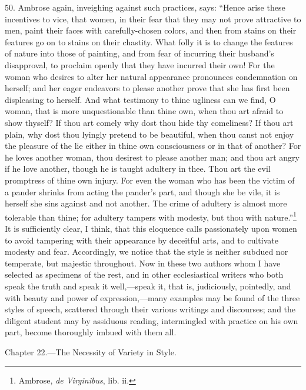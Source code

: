 50. Ambrose again, inveighing against such practices, says: “Hence arise these incentives to vice, that women, in their fear that they may not prove attractive to men, paint their faces with carefully-chosen colors, and then from stains on their features go on to stains on their chastity. What folly it is to change the features of nature into those of painting, and from fear of incurring their husband’s disapproval, to proclaim openly that they have incurred their own! For the woman who desires to alter her natural appearance pronounces condemnation on herself; and her eager endeavors to please another prove that she has first been displeasing to herself. And what testimony to thine ugliness can we find, O woman, that is more unquestionable than thine own, when thou art afraid to show thyself? If thou art comely why dost thou hide thy comeliness? If thou art plain, why dost thou lyingly pretend to be beautiful, when thou canst not enjoy the pleasure of the lie either in thine own consciousness or in that of another? For he loves another woman, thou desirest to please another man; and thou art angry if he love another, though he is taught adultery in thee. Thou art the evil promptress of thine own injury. For even the woman who has been the victim of a pander shrinks from acting the pander’s part, and though she be vile, it is herself she sins against and not another. The crime of adultery is almost more tolerable than thine; for adultery tampers with modesty, but thou with nature.”\footnote{Ambrose, \emph{de Virginibus}, lib. ii.} It is sufficiently clear, I think, that this eloquence calls passionately upon women to avoid tampering with their appearance by deceitful arts, and to cultivate modesty and fear. Accordingly, we notice that the style is neither subdued nor temperate, but majestic throughout. Now in these two authors whom  I have selected as specimens of the rest, and in other ecclesiastical writers who both speak the truth and speak it well,—speak it, that is, judiciously, pointedly, and with beauty and power of expression,—many examples may be found of the three styles of speech, scattered through their various writings and discourses; and the diligent student may by assiduous reading, intermingled with practice on his own part, become thoroughly imbued with them all.


Chapter 22.—The Necessity of Variety in Style.

